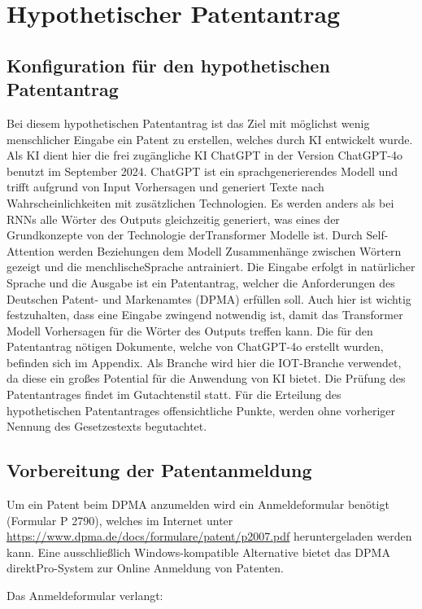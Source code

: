 \chapter{Hypothetischer Patentantrag\label{cha:chapter5}}

\section{Konfiguration für den hypothetischen Patentantrag}

Bei diesem hypothetischen Patentantrag ist das Ziel mit möglichst
wenig menschlicher Eingabe ein Patent zu erstellen,
welches durch KI entwickelt wurde.
Als KI dient hier die frei zugängliche KI ChatGPT in der Version
ChatGPT-4o benutzt im September 2024.
ChatGPT ist ein sprachgenerierendes Modell und trifft aufgrund von
Input Vorhersagen und generiert Texte nach Wahrscheinlichkeiten mit
zusätzlichen Technologien.
Es werden anders als bei RNNs alle Wörter des Outputs
gleichzeitig generiert, was eines der Grundkonzepte von 
der Technologie derTransformer
Modelle ist. Durch Self-Attention werden Beziehungen dem Modell 
Zusammenhänge zwischen Wörtern gezeigt und die menchlischeSprache antrainiert.
Die Eingabe erfolgt in natürlicher Sprache und die Ausgabe
ist ein Patentantrag, welcher die Anforderungen des Deutschen
Patent- und Markenamtes (DPMA) erfüllen soll.
Auch hier ist wichtig festzuhalten, dass eine Eingabe zwingend notwendig ist,
damit das Transformer Modell Vorhersagen für die Wörter des
Outputs treffen kann. 
Die für den Patentantrag nötigen Dokumente, welche
von ChatGPT-4o erstellt wurden, befinden sich im Appendix.
Als Branche wird hier die IOT-Branche verwendet, 
da diese ein großes Potential für die Anwendung von KI bietet.
Die Prüfung des Patentantrages findet im Gutachtenstil statt.
Für die Erteilung des hypothetischen Patentantrages offensichtliche
Punkte, werden ohne vorheriger Nennung des Gesetzestexts begutachtet.
\section{Vorbereitung der Patentanmeldung}

Um ein Patent beim DPMA anzumelden wird ein Anmeldeformular benötigt (Formular P 2790),
welches im Internet unter \url{https://www.dpma.de/docs/formulare/patent/p2007.pdf} heruntergeladen
werden kann. 
Eine ausschließlich Windows-kompatible Alternative bietet
das DPMA direktPro-System zur Online Anmeldung von Patenten.

Das Anmeldeformular verlangt:

